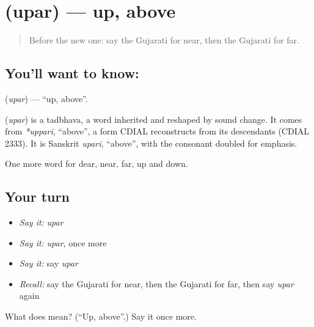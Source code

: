 \section[\texorpdfstring{\gu{ઉપર} (upar)}{ઉપર (upar)}]{ (upar) — up, above}

\label{lesson:GU-C74-up}



\begin{quote}
Before the new one: say the Gujarati for near, then the Gujarati for far.
\end{quote}

\subsection*{You'll want to know: }
\textbf{} (\emph{upar}) — \textquotedblleft{}up, above\textquotedblright{}.

\begin{cousinweb}
\textbf{} (\emph{upar}) is a tadbhava, a word inherited and reshaped by sound change. It comes from \emph{*uppari}, \textquotedblleft{}above\textquotedblright{}, a form CDIAL reconstructs from its descendants (CDIAL 2333). It is Sanskrit \emph{upari}, \textquotedblleft{}above\textquotedblright{}, with the consonant doubled for emphasis.
\end{cousinweb}

\begin{grammarlens}[title={What you've built}]
One more word for dear, near, far, up and down.
\end{grammarlens}

\subsection*{Your turn}
\begin{itemize}
\raggedright
  \item \emph{Say it:} \emph{upar}
  \item \emph{Say it:} \emph{upar}, once more
  \item \emph{Say it:} say \emph{upar}
  \item \emph{Recall:} say the Gujarati for near, then the Gujarati for far, then say \emph{upar} again
\end{itemize}

\begin{tcolorbox}[breakable,colback=teal!4,colframe=teal!35!black,title={Before you move on}]
What does  mean? (\textquotedblleft{}Up, above\textquotedblright{}.) Say it once more.
\end{tcolorbox}
